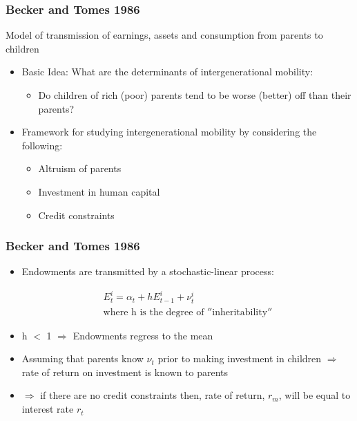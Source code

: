 \documentclass{beamer}
\begin{document}
\begin{frame}
\frametitle{Becker and Tomes 1986}
Model of transmission of earnings, assets and consumption from parents to children 

\begin{itemize}
\item Basic Idea: What are the determinants of intergenerational mobility:
\begin{itemize}
\item Do children of rich (poor) parents tend to be worse (better) off than their parents? 
\end{itemize}

\item Framework for studying intergenerational mobility by considering the following:
\begin{itemize}
\item Altruism of parents 
\item Investment in human capital
\item Credit constraints

\end{itemize}
\end{itemize}
\end{frame}


\begin{frame}
\frametitle{Becker and Tomes 1986}

\begin{itemize}

\item Endowments are transmitted by a stochastic-linear process:

\begin{align*}
E^i_{t} = \alpha_{t} + h E^i_{t-1} + \nu^i_{t}  \\
\text{where h is the degree of $''$inheritability$''$} 
\end{align*}

\item h $<$ 1 $\Rightarrow$  Endowments regress to the mean

\item Assuming that parents know $\nu_{t}$ prior to making investment in children $\Rightarrow$ rate of return on investment is known to parents 

\item $\Rightarrow$ if there are no credit constraints then, rate of return, $r_{m}$, will be equal to interest rate $r_{t}$ 
\end{itemize}
\end{frame}
\end{document}
